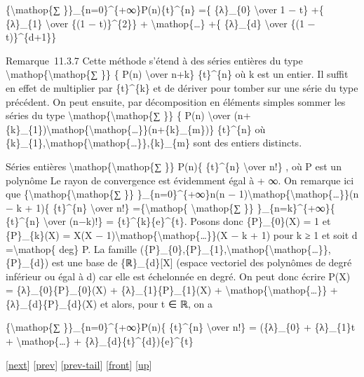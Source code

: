 \documentclass[]{article}
\begin{document}
\{\textbackslash{}mathop\{∑ \}\}\_\{n=0\}\^{}\{+∞\}P(n)\{t\}\^{}\{n\}
=\{ \{λ\}\_\{0\} \textbackslash{}over 1 − t\} +\{ \{λ\}\_\{1\}
\textbackslash{}over \{(1 − t)\}\^{}\{2\}\} +
\textbackslash{}mathop\{\ldots{}\} +\{ \{λ\}\_\{d\} \textbackslash{}over
\{(1 − t)\}\^{}\{d+1\}\}

Remarque~11.3.7 Cette méthode s'étend à des séries entières du type
\textbackslash{}mathop\{\textbackslash{}mathop\{∑ \}\} \{ P(n)
\textbackslash{}over n+k\} \{t\}\^{}\{n\} où k est un entier. Il suffit
en effet de multiplier par \{t\}\^{}\{k\} et de dériver pour tomber sur
une série du type précédent. On peut ensuite, par décomposition en
éléments simples sommer les séries du type
\textbackslash{}mathop\{\textbackslash{}mathop\{∑ \}\} \{ P(n)
\textbackslash{}over
(n+\{k\}\_\{1\})\textbackslash{}mathop\{\textbackslash{}mathop\{\ldots{}\}\}(n+\{k\}\_\{m\})\}
\{t\}\^{}\{n\} où
\{k\}\_\{1\},\textbackslash{}mathop\{\textbackslash{}mathop\{\ldots{}\}\},\{k\}\_\{m\}
sont des entiers distincts.

Séries entières \textbackslash{}mathop\{\textbackslash{}mathop\{∑ \}\}
P(n)\{ \{t\}\^{}\{n\} \textbackslash{}over n!\} , où P est un polynôme
Le rayon de convergence est évidemment égal à + ∞. On remarque ici que
\{\textbackslash{}mathop\{\textbackslash{}mathop\{∑ \}\}
\}\_\{n=0\}\^{}\{+∞\}n(n −
1)\textbackslash{}mathop\{\textbackslash{}mathop\{\ldots{}\}\}(n − k +
1)\{ \{t\}\^{}\{n\} \textbackslash{}over n!\}
=\{\textbackslash{}mathop\{ \textbackslash{}mathop\{∑ \}\}
\}\_\{n=k\}\^{}\{+∞\}\{ \{t\}\^{}\{n\} \textbackslash{}over (n−k)!\} =
\{t\}\^{}\{k\}\{e\}\^{}\{t\}. Posons donc \{P\}\_\{0\}(X) = 1 et
\{P\}\_\{k\}(X) = X(X −
1)\textbackslash{}mathop\{\textbackslash{}mathop\{\ldots{}\}\}(X − k +
1) pour k ≥ 1 et soit d =\textbackslash{}mathop\{ deg\} P. La famille
(\{P\}\_\{0\},\{P\}\_\{1\},\textbackslash{}mathop\{\textbackslash{}mathop\{\ldots{}\}\},\{P\}\_\{d\})
est une base de \{ℝ\}\_\{d\}{[}X{]} (espace vectoriel des polynômes de
degré inférieur ou égal à d) car elle est échelonnée en degré. On peut
donc écrire P(X) = \{λ\}\_\{0\}\{P\}\_\{0\}(X) +
\{λ\}\_\{1\}\{P\}\_\{1\}(X) +
\textbackslash{}mathop\{\textbackslash{}mathop\{\ldots{}\}\} +
\{λ\}\_\{d\}\{P\}\_\{d\}(X) et alors, pour t ∈ ℝ, on a

\{\textbackslash{}mathop\{∑ \}\}\_\{n=0\}\^{}\{+∞\}P(n)\{ \{t\}\^{}\{n\}
\textbackslash{}over n!\} = (\{λ\}\_\{0\} + \{λ\}\_\{1\}t +
\textbackslash{}mathop\{\ldots{}\} +
\{λ\}\_\{d\}\{t\}\^{}\{d\})\{e\}\^{}\{t\}

{[}\href{coursse66.html}{next}{]} {[}\href{coursse64.html}{prev}{]}
{[}\href{coursse64.html\#tailcoursse64.html}{prev-tail}{]}
{[}\href{coursse65.html}{front}{]}
{[}\href{coursch12.html\#coursse65.html}{up}{]}
\end{document}
